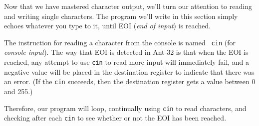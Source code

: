 Now that we have mastered character output, we'll turn our attention
to reading and writing single characters.  The program we'll write in
this section simply echoes whatever you type to it, until EOI ({\em end
of input}) is reached.

The instruction for reading a character from the console is named {\tt
cin} (for {\em console input}).  The way that EOI is detected in
Ant-32 is that when the EOI is reached, any attempt to use {\tt cin}
to read more input will immediately fail, and a negative value will be
placed in the destination register to indicate that there was an
error.  (If the {\tt cin} succeeds, then the destination register gets
a value between 0 and 255.)

Therefore, our program will loop, continually using {\tt cin} to read
characters, and checking after each {\tt cin} to see whether or not
the EOI has been reached.




